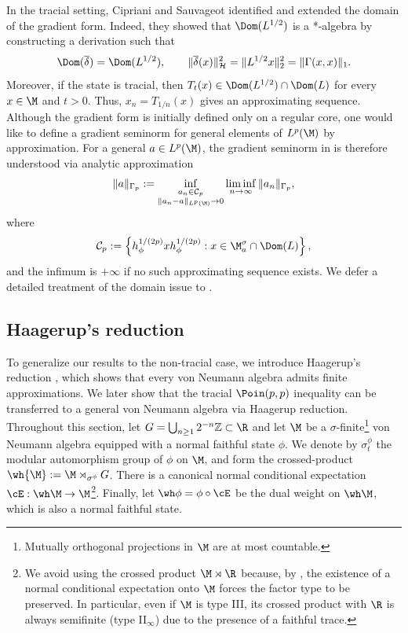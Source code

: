 \documentclass[sn-mathphys-num]{sn-jnl}
\begin{document}
\begin{remark}
In the tracial setting, Cipriani and Sauvageot \cite{cipriani_derivations_2003} identified and extended the domain of the gradient form. Indeed, they showed that $\Dom(L^{1/2})$ is a *-algebra by constructing
a derivation such that
\[
\Dom(\overline\delta)=\Dom(L^{1/2}),
\qquad
\|\overline\delta(x)\|_{\mathcal H}^{2}
=
\|L^{1/2}x\|_2^{2}=\|\Gamma(x,x)\|_1.
\]
Moreover, if the state is tracial, then
$T_t(x)\in \Dom(L^{1/2})\cap\Dom(L)$ for every $x\in\M$ and $t>0$.
Thus, $x_n=T_{1/n}(x)$ gives an approximating sequence.
Although the gradient form is initially defined only on a regular core, one would like to define a gradient seminorm for general elements of $L^p(\M)$ by approximation.
For a general $a\in L^p(\M)$, the gradient seminorm in
 is therefore understood via analytic approximation
\begin{equation}\label{eq:Gamma-p-norm-approximation}
\|a\|_{\Gamma_p}
:=
\inf_{\substack{
 a_n\in\mathcal C_p\\
 \|a_n-a\|_{L^p(\M)}\to0}}
\liminf_{n\to\infty}
\|a_n\|_{\Gamma_p},
\end{equation}
where
\[
\mathcal C_p
:=
\left\{
h_\phi^{1/(2p)}x h_\phi^{1/(2p)}:
x\in\M_a^\sigma\cap\Dom(L)
\right\},
\]
and the infimum is $+\infty$ if no such approximating sequence exists.
We defer a detailed treatment of the domain issue to .
\end{remark}
\subsection{Haagerup's reduction}\label{sec:reduction}
To generalize our results to the non-tracial case, we introduce Haagerup's reduction \cite{haagerup2009reductionmethodnoncommutativelpspaces}, which shows that every von Neumann algebra admits finite approximations. We later show that the tracial $\Poin(p,p)$ inequality can be transferred to a general von Neumann algebra via Haagerup reduction.
Throughout this section, let $  G = \bigcup_{n\ge1}2^{-n}\mathbb{Z}  \subset \R$
and let $\M$ be a $\sigma$-finite\footnote{Mutually orthogonal projections in $\M$ are at most countable.}  von Neumann algebra equipped with a normal faithful state $\phi$.  We denote by
$\sigma_t^{\phi}$ the modular automorphism group of $\phi$ on $\M$, and form the crossed-product
$\wh{\M}:=\M\rtimes_{\sigma^\phi}G$. There is a canonical normal conditional expectation $\cE:\wh\M\to\M$\footnote{We avoid using the crossed product $\M\rtimes\R$ because, by \cite[Sec.~IX.4]{Takesaki_1979}, the existence of a normal conditional expectation onto $\M$ forces the factor type to be preserved.  In particular, even if $\M$ is type III, its crossed product with $\R$ is always semifinite (type II$_\infty$) due to the presence of a faithful trace.}.  Finally, let $\wh\phi=\phi\circ\cE$ be the dual weight on $\wh\M$, which is also a normal faithful state.
\end{document}
